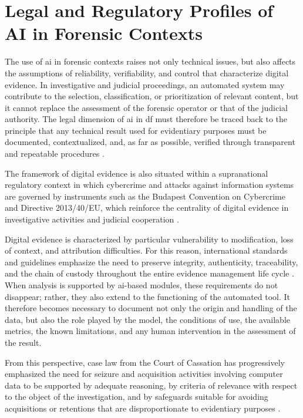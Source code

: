 \section{Legal and Regulatory Profiles of AI in Forensic Contexts}
\label{sec:background_legal_profiles}
The use of \gls{ai} in forensic contexts raises not only technical issues, but
also affects the assumptions of reliability, verifiability, and control that
characterize digital evidence. In investigative and judicial proceedings, an
automated system may contribute to the selection, classification, or
prioritization of relevant content, but it cannot replace the assessment of the
forensic operator or that of the judicial authority. The legal dimension of
\gls{ai} in \gls{df} must therefore be traced back to the principle that any
technical result used for evidentiary purposes must be documented,
contextualized, and, as far as possible, verified through transparent and
repeatable procedures \cite{casey2011digital,iso27037,biasiotti2018handling}.

The framework of digital evidence is also situated within a supranational
regulatory context in which cybercrime and attacks against information systems
are governed by instruments such as the Budapest Convention on Cybercrime and
Directive 2013/40/EU, which reinforce the centrality of digital evidence in
investigative activities and judicial cooperation
\cite{budapest2001convention,directive2013cyber}.

Digital evidence is characterized by particular vulnerability to modification,
loss of context, and attribution difficulties. For this reason, international
standards and guidelines emphasize the need to preserve integrity,
authenticity, traceability, and the chain of custody throughout the entire
evidence management life cycle \cite{iso27037,enfsi2022}. When analysis is
supported by \gls{ai}-based modules, these requirements do not disappear;
rather, they also extend to the functioning of the automated tool. It therefore
becomes necessary to document not only the origin and handling of the data, but
also the role played by the model, the conditions of use, the available
metrics, the known limitations, and any human intervention in the assessment of
the result.

From this perspective, case law from the Court of Cassation has progressively
emphasized the need for seizure and acquisition activities involving computer
data to be supported by adequate reasoning, by criteria of relevance with
respect to the object of the investigation, and by safeguards suitable for
avoiding acquisitions or retentions that are disproportionate to evidentiary
purposes \cite{cassazione2020,cassazione2025}.

